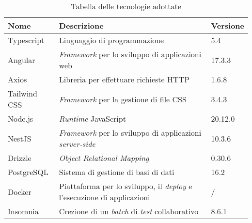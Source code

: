 \begin{table}[H]
	\centering
	\begin{tabularx}{\textwidth}{lXl}
		\hline
		\textbf{Nome} & \textbf{Descrizione}                                                           & \textbf{Versione} \\
		\hline
		Typescript    & Linguaggio di programmazione                                                   & 5.4               \\
		\hline
		Angular       & \textit{Framework} per lo sviluppo di applicazioni web                         & 17.3.3            \\
		\hline
		Axios         & Libreria per effettuare richieste HTTP                                         & 1.6.8             \\
		\hline
		Tailwind CSS  & \textit{Framework} per la gestione di file CSS                                 & 3.4.3             \\
		\hline
		Node.js       & \textit{Runtime} JavaScript                                                    & 20.12.0           \\
		\hline
		NestJS        & \textit{Framework} per lo sviluppo di applicazioni \textit{server-side}                 & 10.3.6            \\
		\hline
		Drizzle       & \textit{Object Relational Mapping}                                             & 0.30.6            \\
		\hline
		PostgreSQL    & Sistema di gestione di basi di dati                                            & 16.2              \\
		\hline
		Docker        & Piattaforma per lo sviluppo, il \textit{deploy} e l'esecuzione di applicazioni & /                 \\
		\hline
		Insomnia      & Crezione di un \textit{batch} di \textit{test} collaborativo                            & 8.6.1             \\
		\hline
	\end{tabularx}
	\caption{Tabella delle tecnologie adottate}
\end{table}
